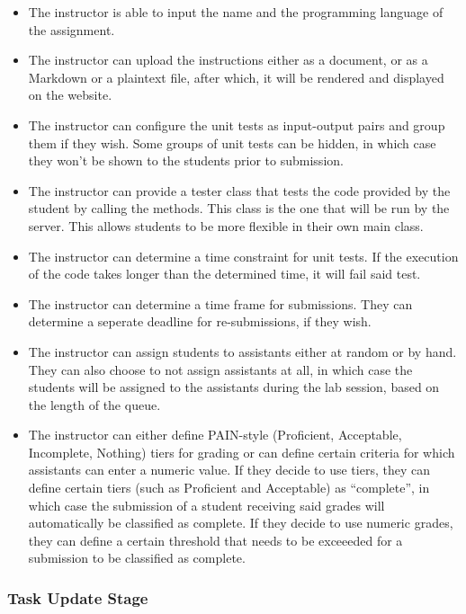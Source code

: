 \documentclass[a4paper, 12pt]{article}
\begin{document}
    \begin{itemize}
        \item The instructor is able to input the name and the programming language of the assignment.
        \item The instructor can upload the instructions either as a document, or as a Markdown
          or a plaintext file, after which, it will be rendered and displayed on the website.
        \item The instructor can configure the unit tests as input-output pairs and group them if
          they wish. Some groups of unit tests can be hidden, in which case they won't be
          shown to the students prior to submission.
        \item The instructor can provide a tester class that tests the code provided by the student
        by calling the methods. This class is the one that will be run by the server. This allows students
        to be more flexible in their own main class.
        \item The instructor can determine a time constraint for unit tests. If the execution
          of the code takes longer than the determined time, it will fail said test.
        \item The instructor can determine a time frame for submissions. They can determine a
          seperate deadline for re-submissions, if they wish.
        \item The instructor can assign students to assistants either at random or by hand.
          They can also choose to not assign assistants at all, in which case the students
          will be assigned to the assistants during the lab session, based on the length
          of the queue.
        \item The instructor can either define PAIN-style (Proficient, Acceptable, Incomplete, Nothing)
          tiers for grading or can define certain criteria for which assistants can enter a numeric value. If they
          decide to use tiers, they can define certain tiers (such as Proficient and Acceptable) as ``complete'',
          in which case the submission of a student receiving said grades will automatically be classified as complete.
          If they decide to use numeric grades, they can define a certain threshold that needs to be exceeeded for a
          submission to be classified as complete.
    \end{itemize}

    \subsubsection{Task Update Stage}
\end{document}
